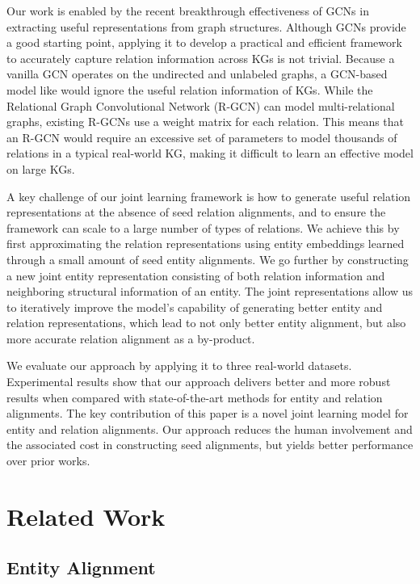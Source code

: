 \documentclass[11pt,a4paper]{article}
\begin{document}
Our work is enabled by the recent breakthrough effectiveness of GCNs \cite{Kipf2016Semi} in extracting useful representations from graph
structures. Although GCNs provide a good starting point, applying it to develop a practical and efficient framework to accurately capture
relation information across KGs is not trivial. Because a vanilla GCN operates on the undirected and unlabeled graphs, a GCN-based model
like \cite{D18-1032} would ignore the useful relation information of KGs. While the Relational Graph Convolutional Network (R-GCN)
\cite{Schlichtkrull2017Modeling} can model multi-relational graphs, existing R-GCNs use a weight matrix for each relation. This means that an R-GCN would require an excessive set of parameters to model thousands of relations in a typical real-world KG, making it difficult
to learn an effective model on large KGs.

A key challenge of our joint learning framework is how to generate useful relation representations at the absence of seed relation
alignments, and to ensure the framework can scale to a large number of types of relations. We achieve this by first approximating the
relation representations using entity embeddings learned through a small amount of seed entity alignments. We go further by constructing a
new joint entity representation consisting of both relation information and neighboring structural information of an entity. The joint
representations allow us to iteratively improve the model's capability of generating better entity and relation representations, which lead
to not only better entity alignment, but also more accurate relation alignment as a by-product.

We evaluate our approach by applying it to three real-world datasets. Experimental results show that our approach delivers better and more
robust results when compared with state-of-the-art methods for entity and relation alignments.
The key contribution of this paper is a novel joint learning model for entity and relation alignments. Our approach reduces the human
involvement and the associated cost in constructing seed alignments, but yields better performance over prior works.



\section{Related Work}
\subsection{Entity Alignment\label{sec:kgalignment}}
\end{document}
